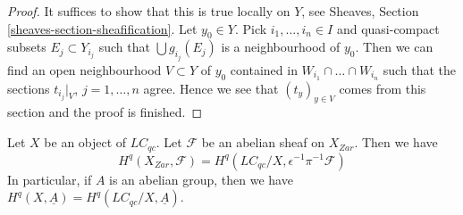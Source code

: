 \begin{proof}
\medskip\noindent
It suffices to show that this is true locally on $Y$, see
Sheaves, Section \ref{sheaves-section-sheafification}. Let $y_0 \in Y$.
Pick $i_1, \ldots, i_n \in I$ and
quasi-compact subsets $E_j \subset Y_{i_j}$ such that
$\bigcup g_{i_j}(E_j)$ is a neighbourhood of $y_0$.
Then we can find an open neighbourhood $V \subset Y$ of $y_0$
contained in $W_{i_1} \cap \ldots \cap W_{i_n}$ such that
the sections $t_{i_j}|_V$, $j = 1, \ldots, n$ agree.
Hence we see that $(t_y)_{y \in V}$ comes from this section
and the proof is finished.
\end{proof}

\begin{lemma}
\label{lemma-compare-cohomology-LC}
Let $X$ be an object of $\textit{LC}_{qc}$. Let $\mathcal{F}$ be an
abelian sheaf on $X_{Zar}$. Then we have
$$
H^q(X_{Zar}, \mathcal{F}) =
H^q(\textit{LC}_{qc}/X, \epsilon^{-1}\pi^{-1}\mathcal{F})
$$
In particular, if $A$ is an abelian group, then we have
$H^q(X, \underline{A}) = H^q(\textit{LC}_{qc}/X, \underline{A})$.
\end{lemma}

